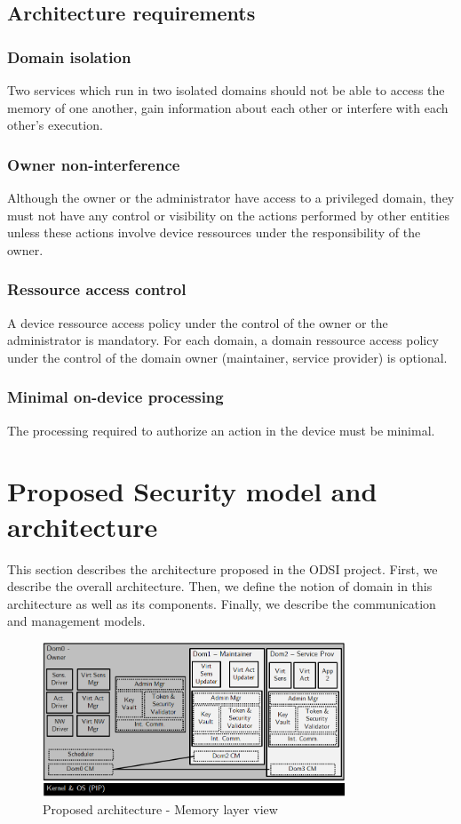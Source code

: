 \documentclass[conference]{IEEEtran}
\begin{document}
\subsection{Architecture requirements}
\label{sec:Arch_req}

\subsubsection{Domain isolation}
Two services which run in two isolated domains should not be able to access the memory of one another, gain information about each other or interfere with each other's execution. 

\subsubsection{Owner non-interference}
Although the owner or the administrator have access to a privileged domain, they must not have any control or visibility on the actions performed by other entities unless these actions involve device ressources under the responsibility of the owner.

\subsubsection{Ressource access control}
A device ressource access policy under the control of the owner or the administrator is mandatory. For each domain, a domain ressource access policy under the control of the domain owner (maintainer, service provider) is optional. 

\subsubsection{Minimal on-device processing}
The processing required to authorize an action in the device must be minimal. 

\section{Proposed Security model and architecture}
\label{sec:Architecture}
This section describes the architecture proposed in the ODSI project. First, we describe the overall architecture. Then, we define the notion of domain in this architecture as well as its components. Finally, we describe the communication and management models.


\begin{figure}[h!]
\centering
\includegraphics[width=9cm]{figures/mem_layout.png}
\caption{Proposed architecture - Memory layer view}
\label{fig:Arch_mem}
\end{figure}
\end{document}
